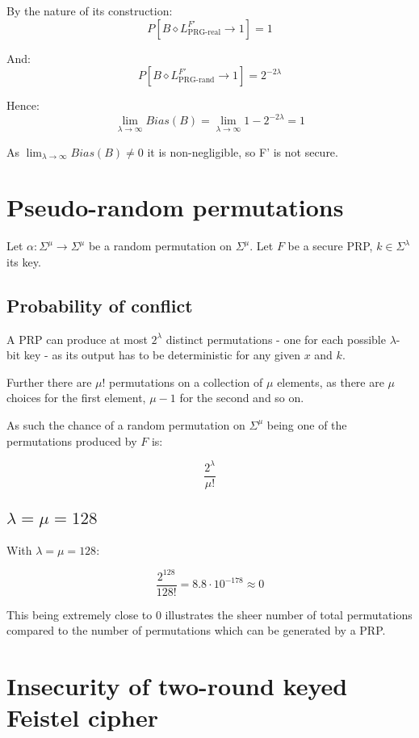 \documentclass[a4paper]{scrreprt}
\begin{document}
By the nature of its construction:
\[
	P[B \diamond L^{F'}_{\text{PRG-real}} \rightarrow 1] = 1
\]

And:
\[
	P[B \diamond L^{F'}_{\text{PRG-rand}} \rightarrow 1] = 2^{-2\lambda}
\]

Hence:
\[
	\lim_{\lambda \to \infty} Bias(B) = \lim_{\lambda \to \infty} 1 - 2^{-2\lambda} = 1
\]

As $\lim_{\lambda \to \infty} Bias(B) \neq 0$ it is non-negligible, so F' is
not secure.

\section{Pseudo-random permutations}

Let $\alpha: \Sigma^\mu \rightarrow \Sigma^\mu$ be a random permutation on
$\Sigma^\mu$. Let $F$ be a secure PRP, $k \in \Sigma^\lambda$ its key.

\subsection{Probability of conflict}


A PRP can produce at most $2^\lambda$ distinct permutations - one for each
possible $\lambda$-bit key - as its output has to be deterministic for any
given $x$ and $k$.

Further there are $\mu!$ permutations on a collection of $\mu$ elements, as
there are $\mu$ choices for the first element, $\mu - 1$ for the second and so
on.

As such the chance of a random permutation on $\Sigma^\mu$ being one of the
permutations produced by $F$ is:

\[
	\frac{2^\lambda}{\mu!}
\]

\subsection{$\lambda = \mu = 128$}

With $\lambda = \mu = 128$:

\[
	\frac{2^{128}}{128!} = 8.8 \cdot 10^{-178} \approx 0
\]

This being extremely close to $0$ illustrates the sheer number of total
permutations compared to the number of permutations which can be generated by a
PRP.

\section{Insecurity of two-round keyed Feistel cipher}
\end{document}
